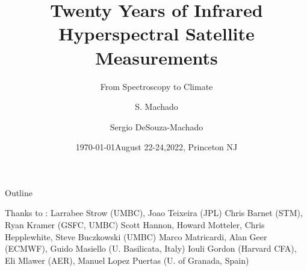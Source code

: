 \documentclass[10pt,t]{beamer}
\author{S. Machado}
\date{\today}
\title{\large Twenty Years of Infrared Hyperspectral Satellite Measurements}
\subtitle{\footnotesize{From Spectroscopy to Climate}}
\date{\vspace{0.1in}\footnotesize{August 22-24,2022, Princeton NJ \vfill}}
\author{Sergio DeSouza-Machado\inst{1}}
\institute[UMBC]{\inst{1}UMBC JCET}
\begin{document}
\maketitle


\begin{frame}[shrink=2]{Outline}

\begin{block}{Thanks to :}
\vspace{0.25in}
Larrabee Strow (UMBC), Joao Teixeira (JPL) \newline
Chris Barnet (STM), Ryan Kramer (GSFC, UMBC) \newline
Scott Hannon, Howard Motteler, Chris Hepplewhite, Steve Buczkowski (UMBC) \newline
Marco Matricardi, Alan Geer (ECMWF), Guido Masiello (U. Basilicata, Italy)  \newline
Iouli Gordon (Harvard CFA), Eli Mlawer (AER), Manuel Lopez Puertas (U. of Granada, Spain)
\end{block}
\end{frame}
\end{document}
